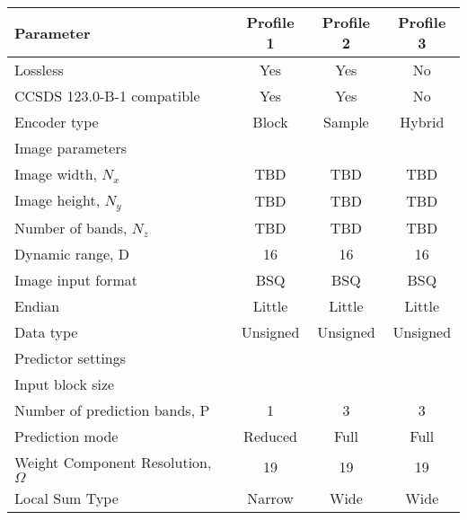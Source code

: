 \begin{table}[!h]
    \centering
    \begin{tabular}{|l|c|c|c|}
        \hline
        Parameter                               & Profile 1     & Profile 2         & Profile 3     \\ \hline
        \hline
        Lossless                                & Yes           & Yes               & No            \\ \hline
        CCSDS 123.0-B-1 compatible              & Yes           & Yes               & No            \\ \hline
        Encoder type	                        & Block	        & Sample            & Hybrid	    \\ \hline
        \hline
        Image parameters \\
        \hline
        Image width, $N_x$                      & TBD           & TBD               & TBD           \\ \hline		
        Image height, $N_y$                     & TBD           & TBD               & TBD           \\ \hline
        Number of bands, $N_z$                  & TBD           & TBD               & TBD           \\ \hline			
        Dynamic range, D	                    & 16            & 16                & 16            \\ \hline
	    Image input format	                    & BSQ	        & BSQ	            & BSQ	        \\ \hline
	    Endian                                  & Little        & Little            & Little        \\ \hline
        Data type                               & Unsigned      & Unsigned          & Unsigned      \\ \hline
        \hline
        Predictor settings \\ \hline
        \hline
	    Input block size \\ \hline				
        Number of prediction bands, P	        & 1	            & 3                 & 3             \\ \hline
        Prediction mode                         & Reduced	    & Full	            & Full	        \\ \hline
        Weight Component Resolution, $\Omega$   & 19            & 19                & 19            \\ \hline
        Local Sum Type                          & Narrow        & Wide              & Wide          \\ \hline

\end{tabular}
\end{table}
